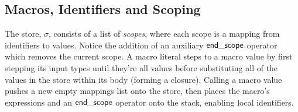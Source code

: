 \documentclass{article}
\begin{document}
\subsection{Macros, Identifiers and Scoping}
The store, $\sigma$, consists of a list of \textit{scopes}, where each scope is a mapping from identifiers to values. Notice the addition of an auxiliary $\mathsf{end\_scope}$ operator which removes the current scope. A macro literal steps to a macro value by first stepping its input types until they're all values before substituting all of the values in the store within its body (forming a closure). Calling a macro value pushes a new empty mappings list onto the store, then places the macro's expressions and an $\mathsf{end\_scope}$ operator onto the stack, enabling local identifiers.
{
    \centering
    \def \MathparLineskip {\lineskip=0.43cm}
}
\end{document}
